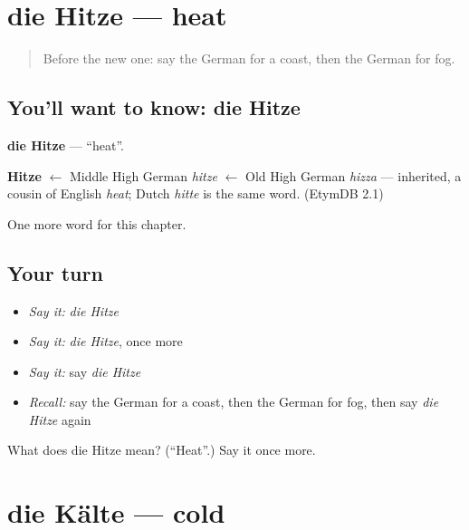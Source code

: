 \section[die Hitze]{die Hitze — heat}

\label{lesson:GE-C197-hitze}



\begin{quote}
Before the new one: say the German for a coast, then the German for fog.
\end{quote}

\subsection*{You'll want to know: die Hitze}
\textbf{die Hitze} — \textquotedblleft{}heat\textquotedblright{}.

\begin{cousinweb}
\textbf{Hitze} $\leftarrow$ Middle High German \emph{hitze} $\leftarrow$ Old High German \emph{hizza} — inherited, a cousin of English \emph{heat}; Dutch \emph{hitte} is the same word. (EtymDB 2.1)
\end{cousinweb}

\begin{grammarlens}[title={What you've built}]
One more word for this chapter.
\end{grammarlens}

\subsection*{Your turn}
\begin{itemize}
\raggedright
  \item \emph{Say it:} \emph{die Hitze}
  \item \emph{Say it:} \emph{die Hitze}, once more
  \item \emph{Say it:} say \emph{die Hitze}
  \item \emph{Recall:} say the German for a coast, then the German for fog, then say \emph{die Hitze} again
\end{itemize}

\begin{tcolorbox}[breakable,colback=teal!4,colframe=teal!35!black,title={Before you move on}]
What does die Hitze mean? (\textquotedblleft{}Heat\textquotedblright{}.) Say it once more.
\end{tcolorbox}
\section[die Kälte]{die Kälte — cold}


